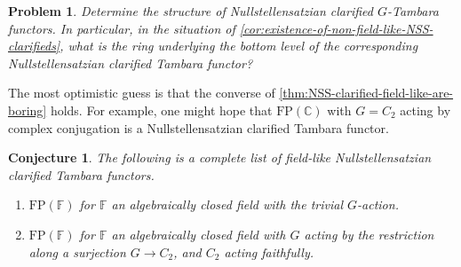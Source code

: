 \documentclass[11pt,dvipsnames]{amsart}
\newcommand{\C}{\mathbb{C}}
\newcommand{\F}{\mathbb{F}}
\theoremstyle{BoldRemark}
\newtheorem{conjecture}[theorem]{Conjecture}
\newtheorem{problem}[theorem]{Problem}
\begin{document}
\begin{problem}\label{problem:what-do-they-look-like?}
	Determine the structure of Nullstellensatzian clarified $G$-Tambara functors. In particular, in the situation of \cref{cor:existence-of-non-field-like-NSS-clarifieds}, what is the ring underlying the bottom level of the corresponding Nullstellensatzian clarified Tambara functor?
\end{problem}

The most optimistic guess is that the converse of \cref{thm:NSS-clarified-field-like-are-boring} holds. For example, one might hope that $\mathrm{FP}(\C)$ with $G = C_2$ acting by complex conjugation is a Nullstellensatzian clarified Tambara functor.

\begin{conjecture}\label{conj:FP-C-is-NSS-clarified}
	The following is a complete list of field-like Nullstellensatzian clarified Tambara functors.
	\begin{enumerate}
		\item $\mathrm{FP}(\F)$ for $\F$ an algebraically closed field with the trivial $G$-action.
		\item $\mathrm{FP}(\F)$ for $\F$ an algebraically closed field with $G$ acting by the restriction along a surjection $G \rightarrow C_2$, and $C_2$ acting faithfully.
	\end{enumerate}
\end{conjecture}



\end{document}
